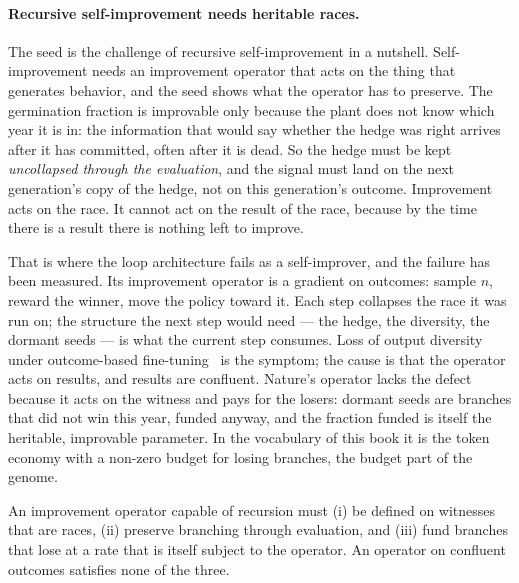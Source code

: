 \paragraph{Recursive self-improvement needs heritable races.}
The seed is the challenge of recursive self-improvement in a nutshell.
Self-improvement needs an improvement operator that acts on the thing
that generates behavior, and the seed shows what the operator has to
preserve.
The germination fraction is improvable only because the plant does not
know which year it is in: the information that would say whether the
hedge was right arrives after it has committed, often after it is dead.
So the hedge must be kept \emph{uncollapsed through the evaluation}, and
the signal must land on the next generation's copy of the hedge, not on
this generation's outcome.
Improvement acts on the race.
It cannot act on the result of the race, because by the time there is a
result there is nothing left to improve.

That is where the loop architecture fails as a self-improver, and the
failure has been measured.
Its improvement operator is a gradient on outcomes: sample $n$, reward
the winner, move the policy toward it.
Each step collapses the race it was run on; the structure the next step
would need --- the hedge, the diversity, the dormant seeds --- is what
the current step consumes.
Loss of output diversity under outcome-based fine-tuning~\cite{Kirk24}
is the symptom; the cause is that the operator acts on results, and
results are confluent.
Nature's operator lacks the defect because it acts on the witness and
pays for the losers: dormant seeds are branches that did not win this
year, funded anyway, and the fraction funded is itself the heritable,
improvable parameter.
In the vocabulary of this book it is the token economy with a non-zero
budget for losing branches, the budget part of the genome.

\begin{observation}
\label{inh:obs:rsi}
An improvement operator capable of recursion must (i) be defined on
witnesses that are races, (ii) preserve branching through evaluation,
and (iii) fund branches that lose at a rate that is itself subject to
the operator.
An operator on confluent outcomes satisfies none of the three.
\end{observation}


